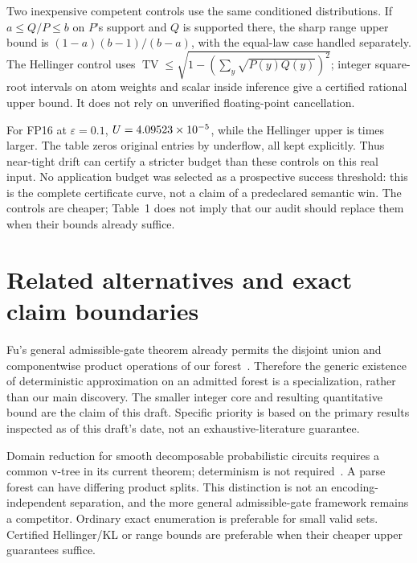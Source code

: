\documentclass[11pt]{article}
\newcommand{\TV}{\operatorname{TV}}
\begin{document}
Two inexpensive competent controls use the same conditioned distributions.
If $a\leq Q/P\leq b$ on $P$'s support and $Q$ is supported there, the sharp
range upper bound is $(1-a)(b-1)/(b-a)$, with the equal-law case handled
separately. The Hellinger control uses
$\TV\leq\sqrt{1-(\sum_y\sqrt{P(y)Q(y)})^2}$; integer square-root intervals
on atom weights and scalar inside inference give a certified rational upper
bound. It does not rely on unverified floating-point cancellation.

\begin{table}[ht]
\centering\small

\caption{All predefined public numerical audits. Seconds describe the core,
not model inference or a competitive speed gate. Rational source rows produce
these rounded display values.}
\end{table}

For FP16 at $\varepsilon=0.1$, $U=4.09523\times10^{-5}{}$, while the Hellinger
upper is \HellingerFactor{} times larger. The table zeros
\FPsixteenZeros{} original entries by underflow, all kept explicitly.
Thus near-tight drift can certify a stricter budget than these controls on
this real input. No application budget was selected as a prospective success
threshold: this is the complete certificate curve, not a claim of a
predeclared semantic win. The controls are cheaper; Table~1 does not imply
that our audit should replace them when their bounds already suffice.

\section{Related alternatives and exact claim boundaries}\label{sec:related}
Fu's general admissible-gate theorem already permits the disjoint union and
componentwise product operations of our forest~\cite{fu}. Therefore the
generic existence of deterministic approximation on an admitted forest is
a specialization, rather than our main discovery. The smaller integer core
and resulting quantitative bound are the claim of this draft. Specific
priority is based on the primary results inspected as of this draft's date,
not an exhaustive-literature guarantee.

Domain reduction for smooth decomposable probabilistic circuits requires a
common v-tree in its current theorem; determinism is not required~\cite{domain}.
A parse forest can have differing product splits. This distinction is not
an encoding-independent separation, and the more general admissible-gate
framework remains a competitor. Ordinary exact enumeration is preferable
for small valid sets. Certified Hellinger/KL or range bounds are preferable
when their cheaper upper guarantees suffice.
\end{document}
